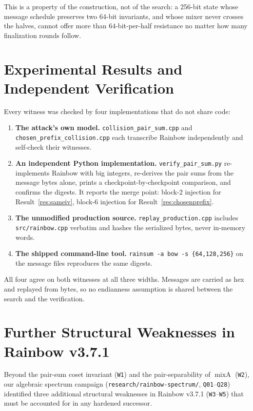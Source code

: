 \documentclass[10pt]{article}
\theoremstyle{definition}
\newcommand{\mixA}{\operatorname{mixA}}
\newcommand{\code}[1]{\texttt{#1}}
\begin{document}
This is a property of the construction, not of the search: a 256-bit state whose message schedule preserves two 64-bit invariants, and whose mixer never crosses the halves, cannot offer more than $64$-bit-per-half resistance no matter how many finalization rounds follow.

\section{Experimental Results and Independent Verification}
\label{sec:verification}

Every witness was checked by four implementations that do not share code:

\begin{enumerate}
  \item \textbf{The attack's own model.} \code{collision\_pair\_sum.cpp} and \code{chosen\_prefix\_collision.cpp} each transcribe Rainbow independently and self-check their witnesses.
  \item \textbf{An independent Python implementation.} \code{verify\_pair\_sum.py} re-implements Rainbow with big integers, re-derives the pair sums from the message bytes alone, prints a checkpoint-by-checkpoint comparison, and confirms the digests. It reports the merge point: block-2 injection for Result~\ref{res:sameiv}, block-6 injection for Result~\ref{res:chosenprefix}.
  \item \textbf{The unmodified production source.} \code{replay\_production.cpp} includes \code{src/rainbow.cpp} verbatim and hashes the serialized bytes, never in-memory words.
  \item \textbf{The shipped command-line tool.} \code{rainsum -a bow -s \{64,128,256\}} on the message files reproduces the same digests.
\end{enumerate}

All four agree on both witnesses at all three widths. Messages are carried as hex and replayed from bytes, so no endianness assumption is shared between the search and the verification.

\section{Further Structural Weaknesses in Rainbow v3.7.1}
\label{sec:further}

Beyond the pair-sum coset invariant (\code{W1}) and the pair-separability of $\mixA$ (\code{W2}), our algebraic spectrum campaign (\code{research/rainbow-spectrum/}, \code{Q01}--\code{Q28}) identified three additional structural weaknesses in Rainbow v3.7.1 (\code{W3}--\code{W5}) that must be accounted for in any hardened successor.
\end{document}
